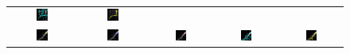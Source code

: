 \begin{figure}[t]
\begin{tabular}{@{}ccccc@{}}
\includegraphics[width=0.19\textwidth]{images/L2S_compare_region/neuron_clear_Li}	&
\includegraphics[width=0.19\textwidth]{images/L2S_compare_region/neuron_clear_ours}	
\\
\includegraphics[width=0.19\textwidth]{images/L2S_compare_region/spine2_orig}	&
\includegraphics[width=0.19\textwidth]{images/L2S_compare_region/spine2_CV}	&
\includegraphics[width=0.19\textwidth]{images/L2S_compare_region/spine2_Lankton} &
\includegraphics[width=0.19\textwidth]{images/L2S_compare_region/spine2_Li}	&
\includegraphics[width=0.19\textwidth]{images/L2S_compare_region/spine2_ours}	

\end{tabular}
\end{figure}
